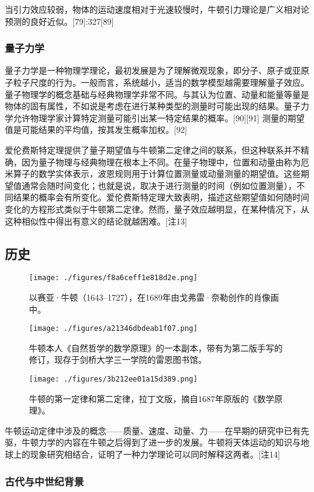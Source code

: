 当引力效应较弱，物体的运动速度相对于光速较慢时，牛顿引力理论是广义相对论预测的良好近似。[79]:327[89]
\subsubsection{量子力学}
量子力学是一种物理学理论，最初发展是为了理解微观现象，即分子、原子或亚原子粒子尺度的行为。一般而言，系统越小，适当的数学模型越需要理解量子效应。量子物理学的概念基础与经典物理学非常不同。与其认为位置、动量和能量等量是物体的固有属性，不如说是考虑在进行某种类型的测量时可能出现的结果。量子力学允许物理学家计算特定测量可能引出某一特定结果的概率。[90][91] 测量的期望值是可能结果的平均值，按其发生概率加权。[92]

爱伦费斯特定理提供了量子期望值与牛顿第二定律之间的联系，但这种联系并不精确，因为量子物理与经典物理在根本上不同。在量子物理中，位置和动量由称为厄米算子的数学实体表示，波恩规则用于计算位置测量或动量测量的期望值。这些期望值通常会随时间变化；也就是说，取决于进行测量的时间（例如位置测量），不同结果的概率会有所变化。爱伦费斯特定理大致表明，描述这些期望值如何随时间变化的方程形式类似于牛顿第二定律。然而，量子效应越明显，在某种情况下，从这种相似性中得出有意义的结论就越困难。[注13]
\subsection{历史}
\begin{figure}[ht]
\centering
\texttt{[image: ./figures/f8a6ceff1e818d2e.png]}
\caption{以赛亚·牛顿（1643–1727），在1689年由戈弗雷·奈勒创作的肖像画中。} \label{fig_NEW01_14}
\end{figure}
\begin{figure}[ht]
\centering
\texttt{[image: ./figures/a21346dbdeab1f07.png]}
\caption{牛顿本人《自然哲学的数学原理》的一本副本，带有为第二版手写的修订，现存于剑桥大学三一学院的雷恩图书馆。} \label{fig_NEW01_15}
\end{figure}
\begin{figure}[ht]
\centering
\texttt{[image: ./figures/3b212ee01a15d389.png]}
\caption{牛顿的第一定律和第二定律，拉丁文版，摘自1687年原版的《数学原理》。} \label{fig_NEW01_16}
\end{figure}
牛顿运动定律中涉及的概念——质量、速度、动量、力——在早期的研究中已有先驱，牛顿力学的内容在牛顿之后得到了进一步的发展。牛顿将天体运动的知识与地球上的现象研究相结合，证明了一种力学理论可以同时解释这两者。[注14]
\subsubsection{古代与中世纪背景}  
